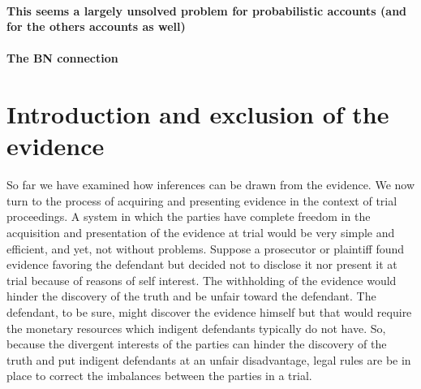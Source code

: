 \documentclass[10pt]{article}
\begin{document}
\paragraph{This seems a largely unsolved problem for probabilistic accounts (and for the others accounts as well)}

\paragraph{The BN connection}


\section{Introduction and exclusion of the evidence}
\label{sec:intexc}

So far we have examined how inferences can be drawn from the evidence.
We now turn to the process of acquiring and presenting evidence in the 
context of trial proceedings. 
A system in which the parties have complete 
 freedom in the acquisition and presentation 
 of the evidence at trial would be very simple and 
 efficient, and yet, not without problems.  
Suppose a prosecutor or plaintiff found evidence favoring the defendant but decided not to disclose it nor present it at trial because of reasons of self interest. The withholding of the evidence would hinder the discovery of the truth and be unfair toward the defendant. The defendant, to be sure, might discover the  evidence himself but that would require the monetary resources which indigent defendants typically do not have. 
So, because the divergent interests of the parties %
can hinder the discovery of the truth and put indigent defendants at an unfair disadvantage, 
legal rules are be in place to correct the imbalances between the parties in a trial.
\end{document}
